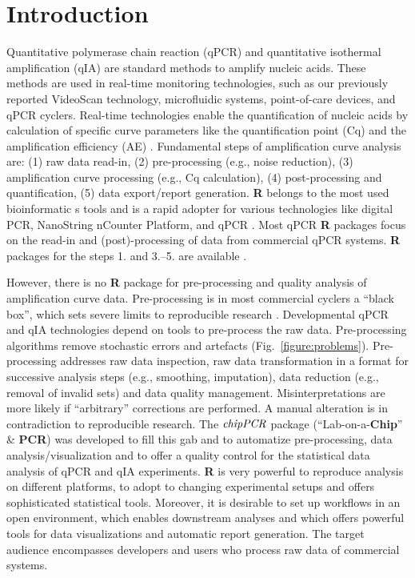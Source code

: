 \documentclass{bioinfo}
\begin{document}
\section{Introduction}

Quantitative polymerase chain reaction (qPCR) and quantitative isothermal 
amplification (qIA) are standard methods to amplify nucleic acids. These methods 
are used in real-time monitoring technologies, such as our previously reported 
VideoScan technology, microfluidic systems, point-of-care devices, and qPCR 
cyclers. Real-time technologies enable the quantification of nucleic acids by 
calculation of specific curve parameters like the quantification point (Cq) and 
the amplification efficiency (AE) 
\citep{roediger_highly_2013,rodiger_nucleic_2014,pabinger_2014}. Fundamental 
steps of amplification curve analysis are: (1) raw data read-in, (2) 
pre-processing (e.g., noise reduction), (3) amplification curve processing 
(e.g., Cq calculation), (4) post-processing and quantification, (5) data 
export/report generation. \textbf{R} belongs to the most used bioinformatic	
s tools and is a rapid adopter for various technologies like digital PCR, 
NanoString nCounter Platform, and qPCR \citep{waggott_2012,pabinger_2014}. Most 
qPCR \textbf{R} packages focus on the read-in and (post)-processing of data from 
commercial qPCR systems. \textbf{R} packages for the steps 1. and 3.--5. are 
available \citep{pabinger_2014,perkins_2012,mccall_2014,gehlenborg_2013}.

However, there is no 
\textbf{R} package for pre-processing and quality analysis of amplification 
curve data. Pre-processing is in most commercial cyclers a ``black box'', which 
sets severe limits to reproducible research \citep{Leeper_2014}. Developmental qPCR and qIA 
technologies depend on tools to pre-process the raw data. Pre-processing 
algorithms remove stochastic errors and artefacts 
(Fig.~\ref{figure:problems}). Pre-processing addresses raw data inspection, 
raw data transformation in a format for successive analysis steps (e.g., 
smoothing, imputation), data reduction (e.g., removal of invalid sets) and data 
quality management. Misinterpretations are more likely if ``arbitrary'' corrections
are performed. A manual alteration is in contradiction to reproducible research. The 
$\emph{chipPCR}$ package (``Lab-on-a-\textbf{Chip}'' \& \textbf{PCR}) was 
developed to fill this gab and to automatize pre-processing, data analysis/visualization and to offer 
a quality control for the statistical data analysis of qPCR and qIA experiments. 
\textbf{R} is very powerful to reproduce analysis on different platforms, to 
adopt to changing experimental setups and offers sophisticated statistical 
tools. Moreover, it is desirable to set up workflows in an open environment, which 
enables downstream analyses and which offers powerful tools for data 
visualizations and automatic report generation. The target audience encompasses 
developers and users who process raw data of commercial systems.
\end{document}
